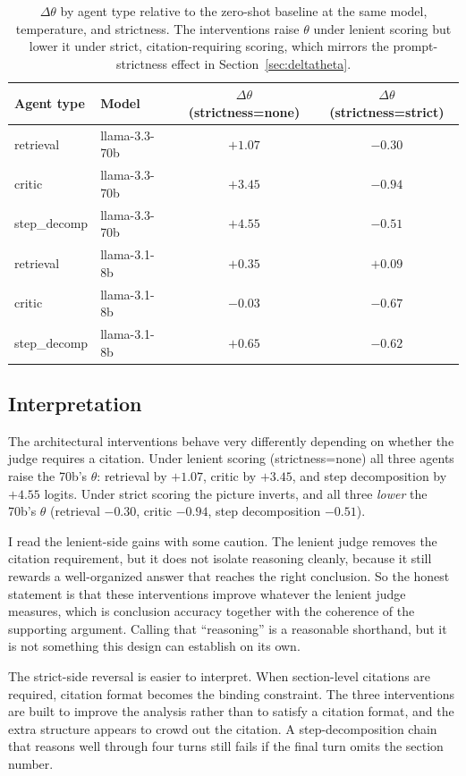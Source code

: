 \begin{table}[htbp]
\centering
\small
\caption{$\Delta\theta$ by agent type relative to the zero-shot baseline
         at the same model, temperature, and strictness. The
         interventions raise $\theta$ under lenient scoring but lower it
         under strict, citation-requiring scoring, which mirrors the
         prompt-strictness effect in Section~\ref{sec:deltatheta}.}
\label{tab:phase3b}
\begin{tabular}{llcc}
\toprule
Agent type & Model & $\Delta\theta$ (strictness=none) & $\Delta\theta$ (strictness=strict) \\
\midrule
retrieval    & llama-3.3-70b & $+1.07$ & $-0.30$ \\
critic       & llama-3.3-70b & $+3.45$ & $-0.94$ \\
step\_decomp & llama-3.3-70b & $+4.55$ & $-0.51$ \\
retrieval    & llama-3.1-8b  & $+0.35$ & $+0.09$ \\
critic       & llama-3.1-8b  & $-0.03$ & $-0.67$ \\
step\_decomp & llama-3.1-8b  & $+0.65$ & $-0.62$ \\
\bottomrule
\end{tabular}
\end{table}

\subsection{Interpretation}
The architectural interventions behave very differently depending on
whether the judge requires a citation. Under lenient scoring
(strictness=none) all three agents raise the 70b's $\theta$: retrieval by
$+1.07$, critic by $+3.45$, and step decomposition by $+4.55$ logits.
Under strict scoring the picture inverts, and all three \emph{lower} the
70b's $\theta$ (retrieval $-0.30$, critic $-0.94$, step decomposition
$-0.51$).

I read the lenient-side gains with some caution. The lenient judge
removes the citation requirement, but it does not isolate reasoning
cleanly, because it still rewards a well-organized answer that reaches
the right conclusion. So the honest statement is that these
interventions improve whatever the lenient judge measures, which is
conclusion accuracy together with the coherence of the supporting
argument. Calling that ``reasoning'' is a reasonable shorthand, but it is
not something this design can establish on its own.

The strict-side reversal is easier to interpret. When section-level
citations are required, citation format becomes the binding constraint.
The three interventions are built to improve the analysis rather than to
satisfy a citation format, and the extra structure appears to crowd out
the citation. A step-decomposition chain that reasons well through four
turns still fails if the final turn omits the section number.

